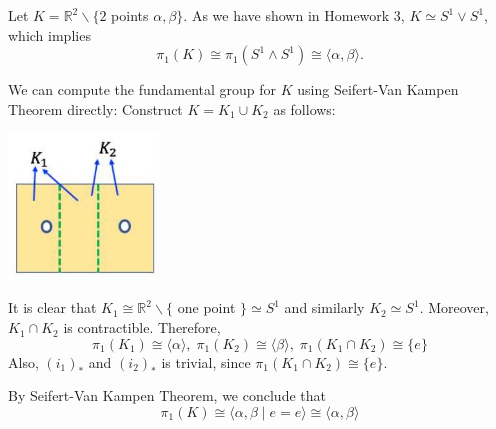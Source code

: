 \begin{example}
Let \(K = {\mathbb{R}}^{2} \smallsetminus  \{ 2\) points \(\alpha,\beta \}\). As we have shown in Homework 3, \(K \simeq  {S}^{1} \vee  {S}^{1}\), which implies
\[
{\pi }_{1}\left( K\right)  \cong  {\pi }_{1}\left( {{S}^{1} \land  {S}^{1}}\right)  \cong  \langle \alpha,\beta \rangle.
\]

We can compute the fundamental group for \(K\) using Seifert-Van Kampen Theorem directly: Construct \(K = {K}_{1} \cup  {K}_{2}\) as follows:
\begin{center}
\includegraphics[width=0.3\textwidth]{images/Ch9_lasteg_K1K2.jpg}
\end{center}
It is clear that \({K}_{1} \cong  {\mathbb{R}}^{2} \smallsetminus  \{\) one point \(\}  \simeq  {S}^{1}\) and similarly \({K}_{2} \simeq  {S}^{1}\). Moreover, \({K}_{1} \cap  {K}_{2}\) is contractible. Therefore,
\[
{\pi }_{1}\left( {K}_{1}\right)  \cong  \langle \alpha \rangle,\;{\pi }_{1}\left( {K}_{2}\right)  \cong  \langle \beta \rangle,\;{\pi }_{1}\left( {{K}_{1} \cap  {K}_{2}}\right)  \cong  \{ e\}
\]
Also, \({\left( {i}_{1}\right) }_{ * }\) and \({\left( {i}_{2}\right) }_{ * }\) is trivial, since \({\pi }_{1}\left( {{K}_{1} \cap  {K}_{2}}\right)  \cong  \{ e\}\).

By Seifert-Van Kampen Theorem, we conclude that
\[
{\pi }_{1}\left( K\right)  \cong  \langle \alpha,\beta  \mid  e = e\rangle  \cong  \langle \alpha,\beta \rangle
\]
\end{example}